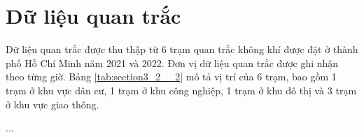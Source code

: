 \section{Dữ liệu quan trắc}
Dữ liệu quan trắc được thu thập từ 6 trạm quan trắc không khí được đặt ở thành phố Hồ Chí Minh năm 2021 và 2022. Đơn vị dữ liệu quan trắc được ghi nhận theo từng giờ. Bảng \ref{tab:section3_2__2} mô tả vị trí của 6 trạm, bao gồm 1 trạm ở khu vực dân cư, 1 trạm ở khu công nghiệp, 1 trạm ở khu đô thị và 3 trạm ở khu vực giao thông.

...
